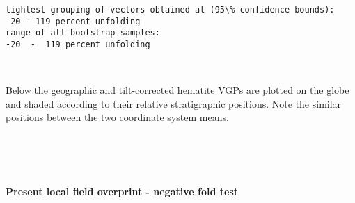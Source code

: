\documentclass[11pt]{article}
\begin{document}
    \begin{Verbatim}[commandchars=\\\{\}]
tightest grouping of vectors obtained at (95\% confidence bounds):
-20 - 119 percent unfolding
range of all bootstrap samples: 
-20  -  119 percent unfolding
    \end{Verbatim}

    \begin{center}
    \end{center}
    { \hspace*{\fill} \\}
    
    Below the geographic and tilt-corrected hematite VGPs are plotted on the
globe and shaded according to their relative stratigraphic positions.
Note the similar positions between the two coordinate system means.


    \begin{center}
    \end{center}
    { \hspace*{\fill} \\}
    

    \begin{center}
    \end{center}
    { \hspace*{\fill} \\}
    
    \paragraph{Present local field overprint - negative fold
test}\label{present-local-field-overprint---negative-fold-test}
\end{document}
